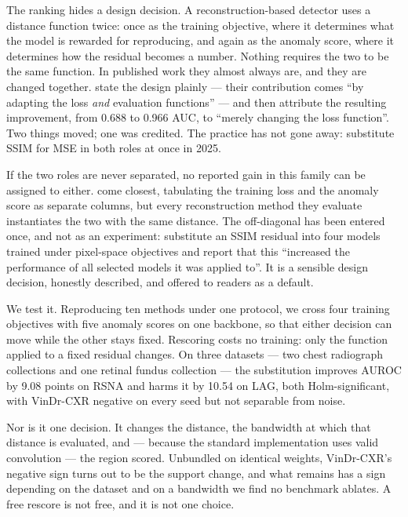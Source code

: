 \documentclass[pmlr,twocolumn,10pt]{jmlr} %
\begin{document}
The ranking hides a design decision. A reconstruction-based detector uses a distance
function twice: once as the training objective, where it determines what the model is
rewarded for reproducing, and again as the anomaly score, where it determines how the
residual becomes a number. Nothing requires the two to be the same function. In published
work they almost always are, and they are changed together.
\citet{bergmann2019improving} state the design plainly --- their contribution comes ``by
adapting the loss \emph{and} evaluation functions'' --- and then attribute the resulting
improvement, from 0.688 to 0.966 AUC, to ``merely changing the loss function''. Two things
moved; one was credited. The practice has not gone away: \citet{fan2025ssim} substitute SSIM
for MSE in both roles at once in 2025.

If the two roles are never separated, no reported gain in this family can be assigned to
either. \citet{cai2025medianomaly} come closest, tabulating the training loss and the anomaly
score as separate columns, but every reconstruction method they evaluate instantiates the
two with the same distance. The off-diagonal has been entered once, and not as an
experiment: \citet{lagogiannis2024unsupervised} substitute an SSIM residual into four models
trained under pixel-space objectives and report that this ``increased the performance of all
selected models it was applied to''. It is a sensible design decision, honestly described,
and offered to readers as a default.

We test it. Reproducing ten methods under one protocol, we cross four training objectives
with five anomaly scores on one backbone, so that either decision can move while the other
stays fixed. Rescoring costs no training: only the function applied to a fixed residual
changes. On three datasets --- two chest radiograph collections and one retinal
fundus collection --- the substitution improves AUROC by 9.08 points on RSNA and harms it by
10.54 on LAG, both Holm-significant, with VinDr-CXR negative on every seed but not separable
from noise.

Nor is it one decision. It changes the distance, the bandwidth at which that distance is
evaluated, and --- because the standard implementation uses valid convolution --- the region
scored. Unbundled on identical weights, VinDr-CXR's negative sign turns out to be the
support change, and what remains has a sign depending on the dataset and on a bandwidth we
find no benchmark ablates. A free rescore is not free, and it is not one choice.
\end{document}

